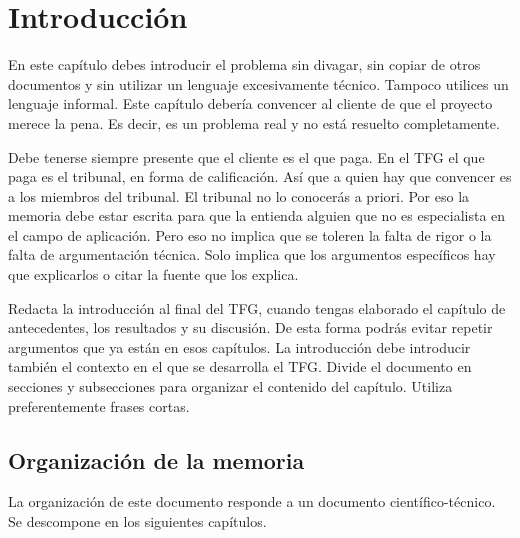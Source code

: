 \chapter{Introducción} 
\label{ch:introduccion}

En este capítulo debes introducir el problema sin divagar, sin copiar de otros documentos y sin utilizar un lenguaje excesivamente técnico.  Tampoco utilices un lenguaje informal.  Este capítulo debería convencer al cliente de que el proyecto merece la pena.  Es decir, es un problema real y no está resuelto completamente.

Debe tenerse siempre presente que el cliente es el que paga.  En el TFG el que paga es el tribunal, en forma de calificación.  Así que a quien hay que convencer es a los miembros del tribunal.  El tribunal no lo conocerás a priori.  Por eso la memoria debe estar escrita para que la entienda alguien que no es especialista en el campo de aplicación.  Pero eso no implica que se toleren la falta de rigor o la falta de argumentación técnica.  Solo implica que los argumentos específicos hay que explicarlos o citar la fuente que los explica.

Redacta la introducción al final del TFG, cuando tengas elaborado el capítulo de antecedentes, los resultados y su discusión.  De esta forma podrás evitar repetir argumentos que ya están en esos capítulos.  La introducción debe introducir también el contexto en el que se desarrolla el TFG.  Divide el documento en secciones y subsecciones para organizar el contenido del capítulo.  Utiliza preferentemente frases cortas.


\section{Organización de la memoria} 
\label{sec:organizacion-memoria}

La organización de este documento responde a un documento científico-técnico. Se descompone en los siguientes capítulos.

